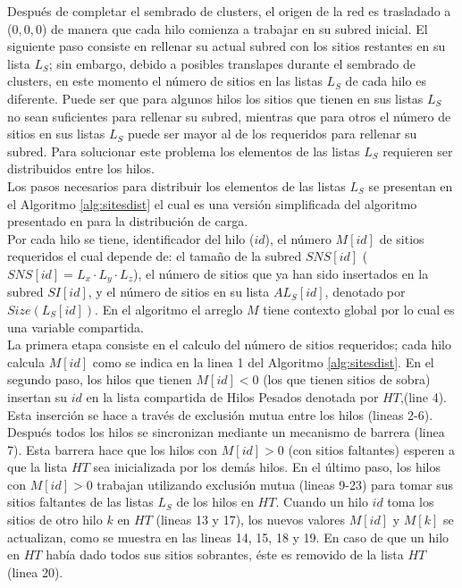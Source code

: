Después de completar el sembrado de clusters, el origen de la red es trasladado a ($0, 0, 0$) de manera que cada hilo
comienza a trabajar en su subred inicial. El siguiente paso consiste en rellenar su actual subred con los sitios restantes 
en su lista $L_S$; sin embargo, debido a posibles translapes durante el sembrado de clusters, en este momento el número 
de sitios en las listas $L_S$ de cada hilo es diferente. Puede ser que para algunos hilos los sitios que tienen en sus 
listas $L_S$ no sean suficientes para rellenar su subred, mientras que para otros el número de sitios en sus listas $L_S$ puede 
ser mayor al de los requeridos para rellenar su subred. Para solucionar este problema los elementos de las listas $L_S$ 
requieren ser distribuidos entre los hilos.\\

Los pasos necesarios para distribuir los elementos de las listas $L_S$ se presentan en el Algoritmo \ref{alg:sitesdist} el 
cual es una versión simplificada del algoritmo presentado en \cite{ref11} para la distribución de carga.\\
Por cada hilo se tiene, identificador del hilo ($id$), el número $M[id]$ de sitios requeridos el cual depende de: el tamaño 
de la subred $SNS[id]$ ($SNS[id] = L_x \cdot L_y \cdot L_z$), el número de sitios que ya han sido insertados en la subred $SI[id]$, 
y el número de sitios en su lista $AL_S[id]$, denotado por $Size(L_S[id])$. En el algoritmo el arreglo $M$ tiene contexto global 
por lo cual es una variable compartida.\\

La primera etapa consiste en el calculo del número de sitios requeridos; cada hilo calcula $M[id]$ como se indica en la linea 
1 del Algoritmo \ref{alg:sitesdist}. En el segundo paso, los hilos que tienen $M[id]<0$ (los que tienen sitios de 
sobra) insertan su $id$ en la lista compartida de Hilos Pesados denotada por $HT$,(line 4). Esta inserción 
se hace a través de exclusión mutua entre los hilos (lineas 2-6). Después todos los hilos se sincronizan mediante un 
mecanismo de barrera (linea 7). Esta barrera hace que los hilos con $M[id]>0$ (con sitios faltantes) esperen a que 
la lista $HT$ sea inicializada por los demás hilos. En el último paso, los hilos con $M[id] > 0$ trabajan utilizando 
exclusión mutua (lineas 9-23) para tomar sus sitios faltantes de las listas $L_S$ de los hilos en $HT$. Cuando un hilo $id$ 
toma los sitios de otro hilo $k$ en $HT$ (lineas 13 y 17), los nuevos valores $M[id]$ y $M[k]$ se actualizan, como se 
muestra en las lineas 14, 15, 18 y 19. En caso de que un hilo en $HT$ había dado todos sus sitios sobrantes, éste es removido 
de la lista $HT$ (linea 20).\\

